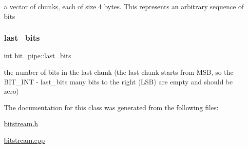 a vector of chunks, each of size 4 bytes. This represents an arbitrary sequence of bits 

\mbox{\label{classbit__pipe_a0f3e84b02751803adaab499b5dad86fe}} 
\subsubsection{\texorpdfstring{last\+\_\+bits}{last\_bits}}
{\footnotesize\ttfamily int bit\+\_\+pipe\+::last\+\_\+bits\hspace{0.3cm}{\ttfamily [private]}}



the number of bits in the last chunk (the last chunk starts from M\+SB, so the B\+I\+T\+\_\+\+I\+NT -\/ last\+\_\+bits many bits to the right (L\+SB) are empty and should be zero) 



The documentation for this class was generated from the following files\+:\begin{DoxyCompactItemize}
\item 
\hyperlink{bitstream_8h}{bitstream.\+h}\item 
\hyperlink{bitstream_8cpp}{bitstream.\+cpp}\end{DoxyCompactItemize}
